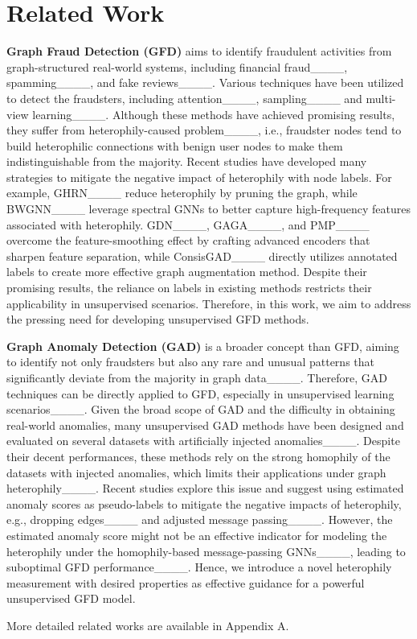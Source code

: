 \section{Related Work}
\noindent \textbf{Graph Fraud Detection (GFD)} aims to identify fraudulent activities from graph-structured real-world systems, including financial fraud____, spamming____, and fake reviews____. Various techniques have been utilized to detect the fraudsters, including attention____, sampling____ and multi-view learning____. 
Although these methods have achieved promising results, they suffer from heterophily-caused problem____, i.e., fraudster nodes tend to build heterophilic connections with benign user nodes to make them indistinguishable from the majority.
Recent studies have developed many strategies to mitigate the negative impact of heterophily with node labels.
For example, GHRN____ reduce heterophily by pruning the graph, while BWGNN____ leverage spectral GNNs to better capture high-frequency features associated with heterophily. GDN____, GAGA____, and PMP____ overcome the feature-smoothing effect by crafting advanced encoders that sharpen feature separation, while ConsisGAD____ directly utilizes annotated labels to create more effective graph augmentation method. 
Despite their promising results, the reliance on labels in existing methods restricts their applicability in unsupervised scenarios. Therefore, in this work, we aim to address the pressing need for developing unsupervised GFD methods.




\noindent \textbf{Graph Anomaly Detection (GAD)} is a broader concept than GFD, aiming to identify not only fraudsters but also any rare and unusual patterns that significantly deviate from the majority in graph data____. Therefore, GAD techniques can be directly applied to GFD, especially in unsupervised learning scenarios____. Given the broad scope of GAD and the difficulty in obtaining real-world anomalies, many unsupervised GAD methods have been designed and evaluated on several datasets with artificially injected anomalies____.
Despite their decent performances, these methods rely on the strong homophily of the datasets with injected anomalies, which limits their applications under graph heterophily____. Recent studies explore this issue and suggest using estimated anomaly scores as pseudo-labels to mitigate the negative impacts of heterophily, e.g., dropping edges____ and adjusted message passing____. 
However, the estimated anomaly score might not be an effective indicator for modeling the heterophily under the homophily-based message-passing GNNs____, leading to suboptimal GFD performance____.
Hence, we introduce a novel heterophily measurement with desired properties as effective guidance for a powerful unsupervised GFD model.

More detailed related works are available in Appendix A.